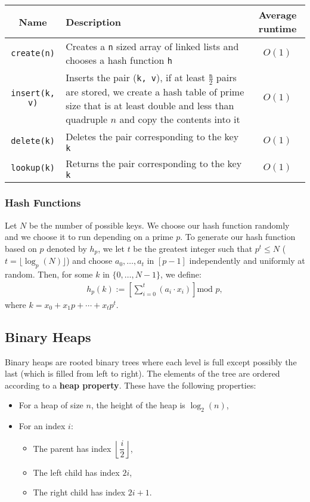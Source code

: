 \begin{center}
  \begin{tabular}{ || c | p{7.5cm} | c || }
    \hline
    Name & Description & Average runtime \\
    \hline
    \texttt{create(n)} & Creates a \texttt{n} sized array
    of linked lists and chooses a hash function \texttt{h} & $O(1)$ \\
    \hline
    \texttt{insert(k, v)} & Inserts the pair (\texttt{k, v}),
    if at least $\frac{\texttt{n}}{2}$ pairs are stored, we create a hash
    table of prime size that is at least double and less than quadruple 
    $n$ and copy the contents into it & $O(1)$ \\
    \hline
    \texttt{delete(k)} & Deletes the pair corresponding to the key \texttt{k} & $O(1)$ \\
    \hline
    \texttt{lookup(k)} & Returns the pair corresponding to the key \texttt{k} & $O(1)$ \\
    \hline
  \end{tabular}
\end{center}

\subsubsection{Hash Functions}

Let $N$ be the number of possible keys.
We choose our hash function randomly and we choose it to run
depending on a prime $p$. To generate our hash function based
on $p$ denoted by $h_p$, we let $t$ be the greatest integer such
that $p^t \leq N$ ($t = \lfloor \log_p(N) \rfloor$) and choose
$a_0, \ldots, a_t$ in $[p - 1]$ independently and uniformly at random.
Then, for some $k$ in $\{0, \ldots, N - 1\}$, we define: \begin{gather*}
  h_p(k) := \left[ 
    \sum_{i = 0}^t (a_i \cdot x_i) 
  \right] \text{mod } p,
\end{gather*} where $k = x_0 + x_1p + \cdots + x_tp^t$.

\newpage

\subsection{Binary Heaps}

Binary heaps are rooted binary trees where each level is full except
possibly the last (which is filled from left to right). The
elements of the tree are ordered according to a 
\textbf{heap property}. These have the following properties: \begin{itemize}
  \item For a heap of size $n$, the height of the heap is $\log_2(n)$,
  \item For an index $i$: \begin{itemize}
    \item The parent has index $\left\lfloor \dfrac{i}{2} \right\rfloor$,
    \item The left child has index $2i$,
    \item The right child has index $2i + 1$.
  \end{itemize}
\end{itemize}


